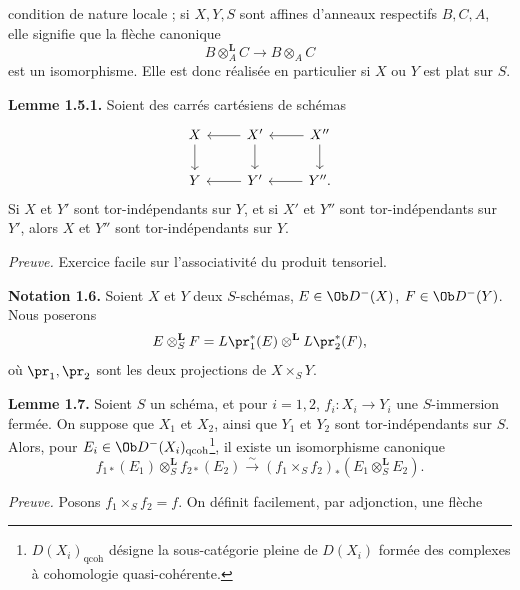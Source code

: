 condition de nature locale ; si \(X,Y,S\) sont affines d'anneaux respectifs \(B,C,A\), elle signifie que la flèche canonique
\[
  B\otimes_A^{\mathbf L}C\longrightarrow B\otimes_A C
\]
est un isomorphisme. Elle est donc réalisée en particulier si \(X\) ou \(Y\) est plat sur \(S\).

\textbf{Lemme 1.5.1.} Soient des carrés cartésiens de schémas
\[
\begin{tikzcd}
X \arrow[d] & X' \arrow[l] \arrow[d] & X'' \arrow[l] \arrow[d]\\
Y & Y' \arrow[l] & Y'' \arrow[l].
\end{tikzcd}
\]
Si \(X\) et \(Y'\) sont tor-indépendants sur \(Y\), et si \(X'\) et \(Y''\) sont tor-indépendants sur \(Y'\), alors \(X\) et \(Y''\) sont tor-indépendants sur \(Y\).

\emph{Preuve.} Exercice facile sur l'associativité du produit tensoriel.

\textbf{Notation 1.6.} Soient \(X\) et \(Y\) deux \(S\)-schémas, \(E\in\Ob D^{-}(X)\), \(F\in\Ob D^{-}(Y)\). Nous poserons
\[
  E\otimes_S^{\mathbf L}F
  =
  L\pr_1^*(E)\otimes^{\mathbf L}L\pr_2^*(F),
\]
où \(\pr_1,\pr_2\) sont les deux projections de \(X\times_SY\).

\textbf{Lemme 1.7.} Soient \(S\) un schéma, et pour \(i=1,2\), \(f_i:X_i\longrightarrow Y_i\) une \(S\)-immersion fermée. On suppose que \(X_1\) et \(X_2\), ainsi que \(Y_1\) et \(Y_2\) sont tor-indépendants sur \(S\). Alors, pour \(E_i\in\Ob D^{-}(X_i)_{\mathrm{qcoh}}\)\footnote{\(D(X_i)_{\mathrm{qcoh}}\) désigne la sous-catégorie pleine de \(D(X_i)\) formée des complexes à cohomologie quasi-cohérente.}, il existe un isomorphisme canonique
\[
  f_{1*}(E_1)\otimes_S^{\mathbf L}f_{2*}(E_2)
  \xrightarrow{\sim}
  (f_1\times_Sf_2)_*(E_1\otimes_S^{\mathbf L}E_2).
\]

\emph{Preuve.} Posons \(f_1\times_Sf_2=f\). On définit facilement, par adjonction, une flèche
